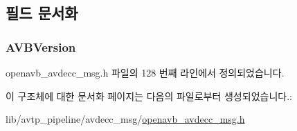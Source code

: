 \subsection{필드 문서화}
\subsubsection[{\texorpdfstring{A\+V\+B\+Version}{AVBVersion}}]{ A\+V\+B\+Version}\hypertarget{structopenavb_avdecc_msg_params___version_callback__t_ae20e1375c7e5bfda67ee623a7ff192b4}{}\label{structopenavb_avdecc_msg_params___version_callback__t_ae20e1375c7e5bfda67ee623a7ff192b4}


openavb\+\_\+avdecc\+\_\+msg.\+h 파일의 128 번째 라인에서 정의되었습니다.



이 구조체에 대한 문서화 페이지는 다음의 파일로부터 생성되었습니다.\+:\begin{DoxyCompactItemize}
\item 
lib/avtp\+\_\+pipeline/avdecc\+\_\+msg/\hyperlink{openavb__avdecc__msg_8h}{openavb\+\_\+avdecc\+\_\+msg.\+h}\end{DoxyCompactItemize}
